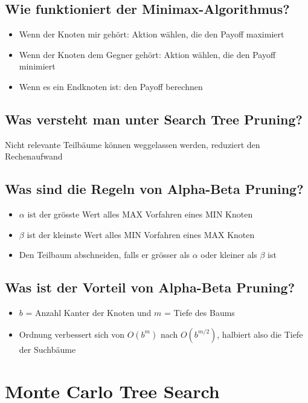 \documentclass[a4paper]{article}
\begin{document}
		\subsection{Wie funktioniert der Minimax-Algorithmus?}
		
		\begin{itemize}
			\item Wenn der Knoten mir gehört: Aktion wählen, die den Payoff maximiert
			\item Wenn der Knoten dem Gegner gehört: Aktion wählen, die den Payoff minimiert
			\item Wenn es ein Endknoten ist: den Payoff berechnen
		\end{itemize}
	
		\subsection{Was versteht man unter Search Tree Pruning?}
		
		Nicht relevante Teilbäume können weggelassen werden, reduziert den Rechenaufwand
		
		\subsection{Was sind die Regeln von Alpha-Beta Pruning?}
		
		\begin{itemize}
			\item $\alpha$ ist der grösste Wert alles MAX Vorfahren eines MIN Knoten
			\item $\beta$ ist der kleinste Wert alles MIN Vorfahren eines MAX Knoten
			\item Den Teilbaum abschneiden, falls er grösser als $\alpha$ oder kleiner als $\beta$ ist
		\end{itemize}
		
		\subsection{Was ist der Vorteil von Alpha-Beta Pruning?}
		
		\begin{itemize}
			\item $b$ = Anzahl Kanter der Knoten und $m$ = Tiefe des Baums
			\item Ordnung verbessert sich von $O(b^{m})$ nach $O(b^{m/2})$, halbiert also die Tiefe der Suchbäume
		\end{itemize}
	
	\section{Monte Carlo Tree Search}
	
\end{document}
